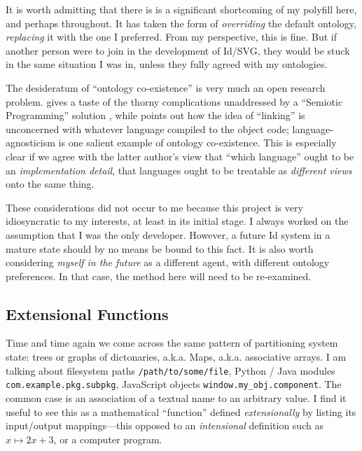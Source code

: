 It is worth admitting that there is is a significant shortcoming of my
polyfill here, and perhaps throughout. It has taken the form of
\emph{overriding} the default ontology, \emph{replacing} it with the one
I preferred. From my perspective, this is fine. But if another person
were to join in the development of Id{}/SVG, they would be stuck in the
same situation I was in, unless they fully agreed with my ontologies.

The desideratum of ``ontology co-existence'' is very much an open
research problem. \cite{crit-semprola} gives a taste of the thorny
complications unaddressed by a ``Semiotic Programming'' solution
\cite{semprola}, while \cite{kell-c} points out how the idea of
``linking'' is unconcerned with whatever language compiled to the object
code; language-agnosticism is one salient example of ontology
co-existence. This is especially clear if we agree with the latter
author's view that ``which language'' ought to be an
\emph{implementation detail}, that languages ought to be treatable as
\emph{different views} onto the same thing.

These considerations did not occur to me because this project is very
idiosyncratic to my interests, at least in its initial stage. I always
worked on the assumption that I was the only developer. However, a
future Id{} system in a mature state should by no means be bound to this
fact. It is also worth considering \emph{myself in the future} as a
different agent, with different ontology preferences. In that case, the
method here will need to be re-examined.

\hypertarget{extensional-functions}{%
\subsection{Extensional Functions}\label{extensional-functions}}

Time and time again we come across the same pattern of partitioning
system state: trees or graphs of dictonaries, a.k.a. Maps, a.k.a.
associative arrays. I am talking about filesystem paths
\texttt{/path/to/some/file}, Python / Java modules
\texttt{com.example.pkg.subpkg}, JavaScript objects
\texttt{window.my\_obj.component}. The common case is an association of
a textual name to an arbitrary value. I find it useful to see this as a
mathematical ``function'' defined \emph{extensionally} by listing its
input/output mappings---this opposed to an \emph{intensional} definition
such as \(x \mapsto 2x+3\), or a computer program.

